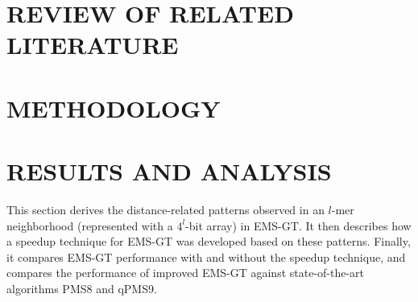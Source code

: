 \documentclass[oneside,12pt]{DISCSthesis}
\begin{document}
\chapter{REVIEW OF RELATED LITERATURE}

\chapter{METHODOLOGY}


\chapter{RESULTS AND ANALYSIS}
	This section derives the distance-related patterns observed in an $l$-mer neighborhood (represented with a $4^l$-bit array) in EMS-GT. It then describes how a speedup technique for EMS-GT was developed based on these patterns. Finally, it compares EMS-GT performance with and without the speedup technique, and compares the performance of improved EMS-GT against state-of-the-art algorithms PMS8 and qPMS9.
\end{document}
